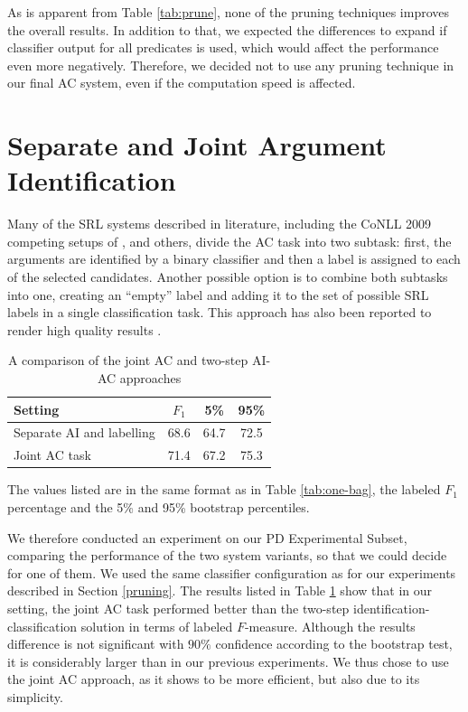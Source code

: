 \documentclass[12pt,notitlepage]{report}
\begin{document}
As is apparent from Table \ref{tab:prune}, none of the pruning techniques improves the overall results. In addition to that, we expected the differences to expand if classifier output for all predicates is used, which would affect the performance even more negatively. Therefore, we decided not to use any pruning technique in our final AC system, even if the computation speed is affected.

\section{Separate and Joint Argument Identification}\label{ai-ac}

Many of the SRL systems described in literature, including the CoNLL 2009 competing setups of \citet{chen09}, \citet{bohnet09} and others, divide the AC task into two subtask: first, the arguments are identified by a binary classifier and then a label is assigned to each of the selected candidates. Another possible option is to combine both subtasks into one, creating an ``empty'' label and adding it to the set of possible SRL labels in a single classification task. This approach has also been reported to render high quality results \citep{che09,asahara09}.

\begin{table}[htb]\label{tab:ai-ac}
\caption{A comparison of the joint AC and two-step AI-AC approaches}\footnotesize
\begin{center}
\begin{tabular}{|l|c|c|c|}\hline
\bf Setting & $F_1$ & \bf 5\% & \bf 95\% \\\hline
Separate AI and labelling & 68.6 & 64.7 & 72.5 \\
Joint AC task & 71.4 & 67.2 & 75.3 \\\hline
\end{tabular}
\end{center}
The values listed are in the same format as in Table \ref{tab:one-bag}, the labeled $F_1$ percentage and the 5\% and 95\% bootstrap percentiles.
\end{table}

We therefore conducted an experiment on our PD Experimental Subset, comparing the performance of the two system variants, so that we could decide for one of them. We used the same classifier configuration as for our experiments described in Section \ref{pruning}. The results listed in Table \ref{tab:ai-ac} show that in our setting, the joint AC task performed better than the two-step identification-classification solution in terms of labeled $F$-measure. Although the results difference is not significant with $90\%$ confidence according to the bootstrap test, it is considerably larger than in our previous experiments. We thus chose to use the joint AC approach, as it shows to be more efficient, but also due to its simplicity.
\end{document}
